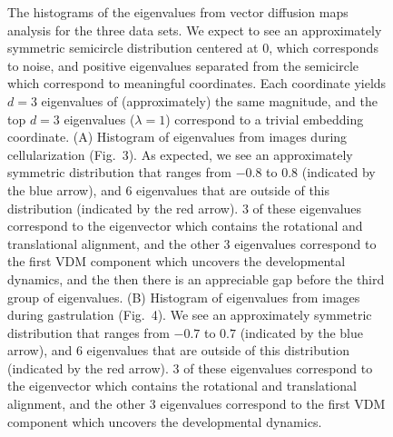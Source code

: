 \documentclass{pnastwo}
\newcommand{\fig}[0]{Fig.}
\begin{document}
\begin{figure}
\begin{tikzpicture}
\end{tikzpicture}
\caption{The histograms of the eigenvalues from vector diffusion maps analysis for the three data sets. 
%
We expect to see an approximately symmetric semicircle distribution centered at 0, which corresponds to noise, and positive eigenvalues separated from the semicircle which correspond to meaningful coordinates. 
%
Each coordinate yields $d=3$ eigenvalues of (approximately) the same magnitude, and the top $d=3$ eigenvalues ($\lambda=1$) correspond to a trivial embedding coordinate.
%
(A) Histogram of eigenvalues from images during cellularization (\fig~3). As expected, we see an approximately symmetric distribution that ranges from $-0.8$ to $0.8$ (indicated by the blue arrow), and $6$ eigenvalues that are outside of this distribution (indicated by the red arrow). $3$ of these eigenvalues correspond to the eigenvector which contains the rotational and translational alignment, and the other $3$ eigenvalues correspond to the first VDM component which uncovers the developmental dynamics, and the then there is an appreciable gap before the third group of eigenvalues.
%
(B) Histogram of eigenvalues from images during gastrulation (\fig~4). We see an approximately symmetric distribution that ranges from $-0.7$ to $0.7$ (indicated by the blue arrow), and $6$ eigenvalues that are outside of this distribution (indicated by the red arrow). $3$ of these eigenvalues correspond to the eigenvector which contains the rotational and translational alignment, and the other $3$ eigenvalues correspond to the first VDM component which uncovers the developmental dynamics.
}
\end{figure}
\end{document}
